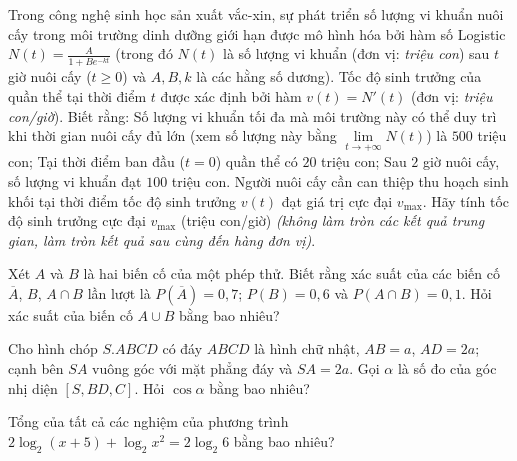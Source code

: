 \begin{baitap} %
	Trong công nghệ sinh học sản xuất vắc-xin, sự phát triển số lượng vi khuẩn nuôi cấy trong môi trường dinh dưỡng giới hạn được mô hình hóa bởi hàm số Logistic $N(t) = \frac{A}{1 + Be^{-kt}}$ (trong đó $N(t)$ là số lượng vi khuẩn (đơn vị: \textit{triệu con}) sau $t$ giờ nuôi cấy ($t \ge 0$) và $A, B, k$ là các hằng số dương). Tốc độ sinh trưởng của quần thể tại thời điểm $t$ được xác định bởi hàm $v(t) = N'(t)$ (đơn vị: \textit{triệu con/giờ}). Biết rằng: Số lượng vi khuẩn tối đa mà môi trường này có thể duy trì khi thời gian nuôi cấy đủ lớn (xem số lượng này bằng $\lim\limits_{t \to +\infty} N(t)$) là $500$ triệu con; Tại thời điểm ban đầu ($t = 0$) quần thể có $20$ triệu con; Sau $2$ giờ nuôi cấy, số lượng vi khuẩn đạt $100$ triệu con. Người nuôi cấy cần can thiệp thu hoạch sinh khối tại thời điểm tốc độ sinh trưởng $v(t)$ đạt giá trị cực đại $v_{\max}$. Hãy tính tốc độ sinh trưởng cực đại $v_{\max}$ (triệu con/giờ) \textit{(không làm tròn các kết quả trung gian, làm tròn kết quả sau cùng đến hàng đơn vị)}.
\end{baitap}
\begin{baitap}
	Xét $A$ và $B$ là hai biến cố của một phép thử. Biết rằng xác suất của các biến cố $\overline{A}$, $B$, $A \cap B$ lần lượt là $P(\overline{A}) = 0{,}7$; $P(B) = 0{,}6$ và $P(A \cap B) = 0{,}1$. Hỏi xác suất của biến cố $A \cup B$ bằng bao nhiêu?
\end{baitap}

\begin{baitap}
	Cho hình chóp $S.ABCD$ có đáy $ABCD$ là hình chữ nhật, $AB = a$, $AD = 2a$; cạnh bên $SA$ vuông góc với mặt phẳng đáy và $SA = 2a$. Gọi $\alpha$ là số đo của góc nhị diện $[S, BD, C]$. Hỏi $\cos \alpha$ bằng bao nhiêu?
\end{baitap}

\begin{baitap}
	Tổng của tất cả các nghiệm của phương trình $2\log_2(x + 5) + \log_2 x^2 = 2\log_2 6$ bằng bao nhiêu?
\end{baitap}






